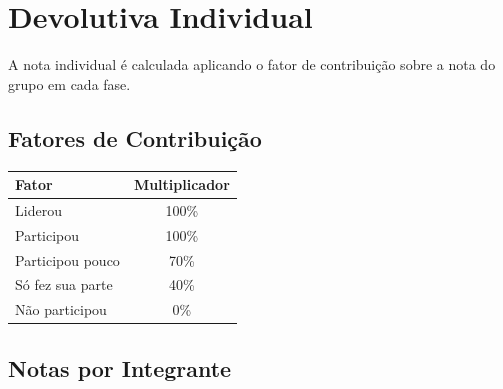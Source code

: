 \documentclass[
  sigconf,
  nonacm, %
  language=portuguese
]{acmart}
\begin{document}
\section{Devolutiva Individual}

A nota individual é calculada aplicando o fator de contribuição sobre a nota do grupo em cada fase.

\subsection{Fatores de Contribuição}

\begin{tabularx}{0.6\linewidth}{@{} X c @{}}
\toprule
\textbf{Fator} & \textbf{Multiplicador} \\
\midrule
Liderou & 100\% \\
Participou & 100\% \\
Participou pouco & 70\% \\
Só fez sua parte & 40\% \\
Não participou & 0\% \\
\bottomrule
\end{tabularx}

\vspace{1em}
\subsection{Notas por Integrante}
\end{document}
